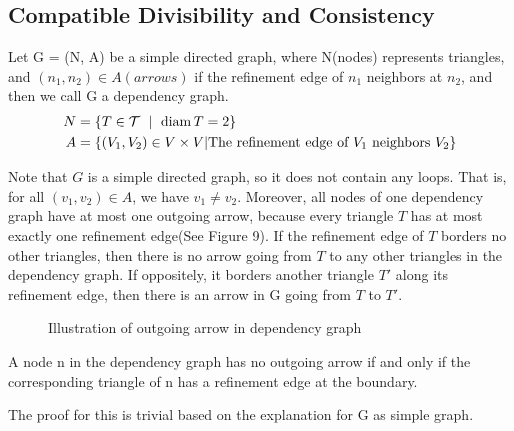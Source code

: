     \subsection{Compatible Divisibility and Consistency}
    \begin{definition*}
      Let G = (N, A) be a simple directed graph, where N(nodes) represents triangles, and $(n_1, n_2)\in A (arrows)$ if the refinement edge of $n_1$ neighbors at $n_2$, and then we call G a dependency graph.
      \begin{align*}
      N &= \{T\in\mathcal{T}~\mid~\operatorname{diam}{T} = 2\}\\
      A &= \{(V_1, V_2)\in V\times V | \text{The refinement edge of $V_1$ neighbors $V_2$}\}
      \end{align*}
    \end{definition*}
    Note that $G$ is a simple directed graph, so it does not contain any loops. That is, for all $(v_1, v_2)\in A$, we have $v_1\neq v_2$. Moreover, all nodes of one dependency graph have at most one outgoing arrow, because every triangle $T$ has at most exactly one refinement edge(See Figure 9). If the refinement edge of $T$ borders no other triangles, then there is no arrow going from $T$ to any other triangles in the dependency graph. If oppositely, it borders another triangle $T'$ along its refinement edge, then there is an arrow in G going from $T$ to $T'$.  %
    \begin{figure}[h!]
    \centering
    \caption{Illustration of outgoing arrow in dependency graph}
    \label{Fig9}
    \end{figure}

    \begin{lemma*}
    A node n in the dependency graph has no outgoing arrow if and only if the corresponding triangle of n has a refinement edge at the boundary.
    \end{lemma*}
    The proof for this is trivial based on the explanation for G as simple graph.

